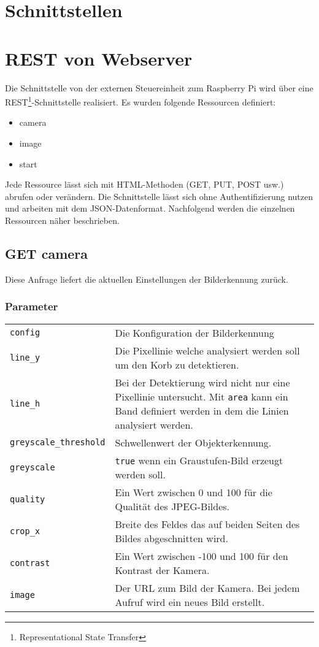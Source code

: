 \section{Schnittstellen}

\section{REST von Webserver}

Die Schnittstelle von der externen Steuereinheit zum Raspberry Pi wird über eine REST\footnote{Representational State Transfer}-Schnittstelle realisiert. Es wurden folgende Ressourcen definiert:
\begin{itemize}
	\item camera
	\item image
	\item start
\end{itemize}
Jede Ressource lässt sich mit HTML-Methoden (GET, PUT, POST usw.) abrufen oder verändern. Die Schnittstelle lässt sich ohne Authentifizierung nutzen und arbeiten mit dem JSON-Datenformat. Nachfolgend werden die einzelnen Ressourcen näher beschrieben.

\subsection{GET camera}

Diese Anfrage liefert die aktuellen Einstellungen der Bilderkennung zurück.

\subsubsection{Parameter}

\begin{tabular}{l p{16cm}}
	\texttt{config} & Die Konfiguration der Bilderkennung \\
	\texttt{line\_y} & Die Pixellinie welche analysiert werden soll um den Korb zu detektieren. \\
	\texttt{line\_h} & Bei der Detektierung wird nicht nur eine Pixellinie untersucht. Mit \texttt{area} kann ein Band definiert werden in dem die Linien analysiert werden. \\
	\texttt{greyscale\_threshold} & Schwellenwert der Objekterkennung. \\
	\texttt{greyscale} & \texttt{true} wenn ein Graustufen-Bild erzeugt werden soll. \\
	\texttt{quality} & Ein Wert zwischen 0 und 100 für die Qualität des JPEG-Bildes. \\
	\texttt{crop\_x} & Breite des Feldes das auf beiden Seiten des Bildes abgeschnitten wird. \\
	\texttt{contrast} & Ein Wert zwischen -100 und 100 für den Kontrast der Kamera. \\
	\texttt{image} & Der URL zum Bild der Kamera. Bei jedem Aufruf wird ein neues Bild erstellt.
\end{tabular}

